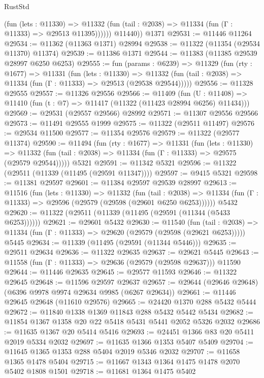 \begin{lexlean}{RustStd}
\begin{coremodule}
              (fun (lets : @11330) =>
              @11332 (fun (tail : @2038) => @11334 (fun (Γ : @11333) => @29513 @11395))))))
        @11440))
    @1371
@29531 := @11446 @11264
@29534 := @11362 (@11363 @1371) @28994
@29538 := @11322 (@11354 (@29534 @11370) @11374)
@29539 := @11386 @1371
@29544 := @11383 (@11385 @29539 @28997 @6250 @6253)
@29555 := fun (params : @6239) =>
  @11329
    (fun (rty : @1677) =>
    @11331
      (fun (lets : @11330) =>
      @11332 (fun (tail : @2038) => @11334 (fun (Γ : @11333) => @29513 (@29538 @29544)))))
@29556 := @11328 @29555
@29557 := @11326 @29556
@29566 := @11409
    (fun (U : @11408) => @11410 (fun (t : @7) => @11417 (@11322 (@11423 @28994 @6256) @11434)))
@29569 := @29531 (@29557 @29566) @28992
@29571 := @11307 @29556 @29566
@29573 := @11491 @29555 @1999
@29575 := @11322 (@29511 @11497)
@29576 := @29534 @11500
@29577 := @11354 @29576
@29579 := @11322 (@29577 @11374)
@29590 := @11494
    (fun (rty : @1677) =>
    @11331
      (fun (lets : @11330) =>
      @11332 (fun (tail : @2038) => @11334 (fun (Γ : @11333) => @29575 (@29579 @29544)))))
    @5321
@29591 := @11342 @5321
@29596 := @11322 (@29511 (@11339 (@11495 (@29591 @11347))))
@29597 := @9415 @5321
@29598 := @11381 @29597
@29601 := @11384 @29597 @29539 @28997
@29613 := @11516
    (fun (lets : @11330) =>
    @11332
      (fun (tail : @2038) =>
      @11334 (fun (Γ : @11333) => @29596 (@29579 (@29598 (@29601 @6250 @6253))))))
    @5432
@29620 := @11322 (@29511 (@11339 (@11495 (@29591 (@11344 (@5433 @6253))))))
@29621 := @29601 @5432
@29630 := @11540
    (fun (tail : @2038) => @11334 (fun (Γ : @11333) => @29620 (@29579 (@29598 (@29621 @6253)))))
    @5445
@29634 := @11339 (@11495 (@29591 (@11344 @5446)))
@29635 := @29511 @29634
@29636 := @11322 @29635
@29637 := @29621 @5445
@29643 := @11558 (fun (Γ : @11333) => @29636 (@29579 (@29598 @29637))) @11590
@29644 := @11446 @29635
@29645 := @29577 @11593
@29646 := @11322 @29645
@29648 := @11596 @29597 @29637
@29657 := @29644 (@29646 @29648) (@6396 @9978 @9974 @29634 @9985 (@6267 @29634))
@29661 := @11446 @29645 @29648 (@11610 @29576)
@29665 := @24420 @1370 @288 @5432 @5444
@29672 := @11840 @1338 @1369 @11843 @288 @5432 @5442 @5434
@29682 := @11854 @1367 @1358 @20 @22 @5418 @5431 @5441 @2052 @5326 @2032
@29686 := @11635 @1367 @20 @5414 @5416
@29693 := @24451 @1366 @83 @20 @5411 @2019 @5334 @2032
@29697 := @11635 @1366 @1353 @5407 @5409
@29704 := @11645 @1365 @1353 @288 @5404 @2019 @5346 @2032
@29707 := @11658 @1365 @1478 @5404
@29715 := @11667 @1343 @1364 @1475 @1478 @2070 @5402 @1808 @1501
@29718 := @11681 @1364 @1475 @5402

\end{coremodule}
\end{lexlean}
